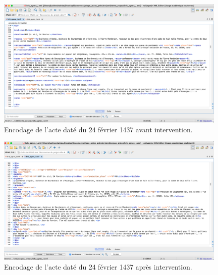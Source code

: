 \begin{figure}[H]
    \centering
    \includegraphics[scale=0.3]{front/images/teinte_agnes.png}
    \caption{Encodage de l'acte daté du 24 février 1437 avant intervention.}
    \label{fig:encodage_avant}
\end{figure}

\begin{figure}[H]
    \centering
    \includegraphics[scale=0.3]{front/images/restruct_agnes.png}
    \caption{Encodage de l'acte daté du 24 février 1437 après intervention.}
    \label{fig:encodage_après}
\end{figure}
\newpage 

